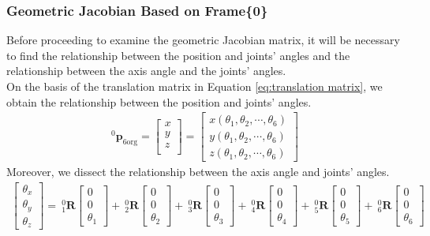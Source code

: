 \subsubsection{Geometric Jacobian Based on Frame\{0\}}
Before proceeding to examine the geometric Jacobian matrix, it will be necessary to find the relationship between the position and joints' angles and the relationship between the axis angle and the joints' angles.\\
On the basis of the translation matrix in Equation \ref{eq:translation matrix}, we obtain the relationship between the position and joints' angles.
\begin{equation}
\begin{split}
^0\boldsymbol{p}_\mathrm{6org}
= 
\begin{bmatrix}
x\\
y\\
z\\
\end{bmatrix} 
=
\begin{bmatrix}
x(\theta _1, \theta _2, \cdots, \theta _6)\\
y(\theta _1, \theta _2, \cdots, \theta _6)\\
z(\theta _1, \theta _2, \cdots, \theta _6)
\end{bmatrix} 
\end{split}
\end{equation}\label{eq:lin vel}
Moreover, we dissect the relationship between the axis angle and joints' angles.
\begin{equation}
\begin{split}
\begin{bmatrix}
\theta _x \\
\theta _y \\
\theta _z 
\end{bmatrix}
=
\ ^0_1\mathbf{R}
\begin{bmatrix}
0 \\ 
0 \\ 
\theta _1
\end{bmatrix}
+
\ ^0_2\mathbf{R}
\begin{bmatrix}
0 \\ 
0 \\ 
\theta _2
\end{bmatrix}
+
\ ^0_3\mathbf{R}
\begin{bmatrix}
0 \\ 
0 \\ 
\theta _3
\end{bmatrix}
+
\ ^0_4\mathbf{R}
\begin{bmatrix}
0 \\ 
0 \\ 
\theta _4
\end{bmatrix}
+
\ ^0_5\mathbf{R}
\begin{bmatrix}
0 \\ 
0 \\ 
\theta _5
\end{bmatrix}
+
\ ^0_6\mathbf{R}
\begin{bmatrix}
0 \\ 
0 \\ 
\theta _6
\end{bmatrix}
\end{split}
\end{equation}\label{eq:ang vel_axis}
